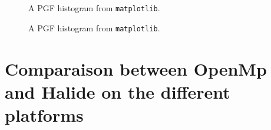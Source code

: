 \begin{figure}
	    \captionsetup{skip=1cm}
	
    \caption{A PGF histogram from \texttt{matplotlib}.}
\end{figure}

\begin{figure}
	    \captionsetup{skip=1cm}
        
    \caption{A PGF histogram from \texttt{matplotlib}.}
\end{figure}

\section{Comparaison between OpenMp and Halide on the different platforms}
